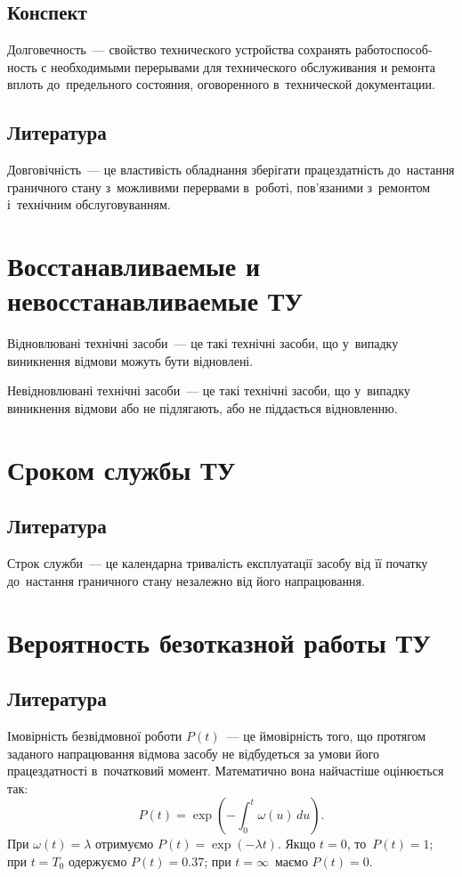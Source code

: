 \documentclass[
	a4paper,
	oneside,
	DIV = 14,
	fontsize = 14pt,
	headings = normal,
]{scrartcl}
\begin{document}
		\subsection{Конспект}
		\begin{russian}
			Долговечность~— свойство технического устройства сохранять работоспособность с необходимыми перерывами для технического обслуживания и ремонта вплоть до~предельного состояния, оговоренного в~технической документации.
		\end{russian}

		\subsection{Литература}
			Довговічність~— це властивість обладнання зберігати працездатність до~настання граничного стану з~можливими перервами в~роботі, пов'язаними з~ремонтом і~технічним обслуговуванням.

	\section{Восстанавливаемые и невосстанавливаемые ТУ}
		Відновлювані технічні засоби~— це такі технічні засоби, що у~випадку виникнення відмови можуть бути відновлені. 

		Невідновлювані технічні засоби~— це такі технічні засоби, що у~випадку виникнення відмови або не підлягають, або не піддається відновленню.

	\section{Сроком службы ТУ}
		\subsection{Литература}
			Строк служби~— це календарна тривалість експлуатації засобу від її початку до~настання граничного стану незалежно від його напрацювання.

	\section{Вероятность безотказной работы ТУ}
		\subsection{Литература}
			Імовірність безвідмовної роботи $P(t)$~— це ймовірність того, що протягом заданого напрацювання відмова засобу не відбудеться за умови його працездатності в~початковий момент. Математично вона найчастіше оцінюється так:
			\[
				P(t) = \exp{\left( -\int_{0}^{t} \omega(u)\,du \right)}.
			\]
			При $\omega(t) = \lambda$ отримуємо $P(t) = \exp(-\lambda t)$. Якщо $t = 0$, то~$P(t) = 1$; при $t = T_0$ одержуємо $P(t) = 0.37$; при $t = \infty$~маємо $P(t) = 0$.
\end{document}
